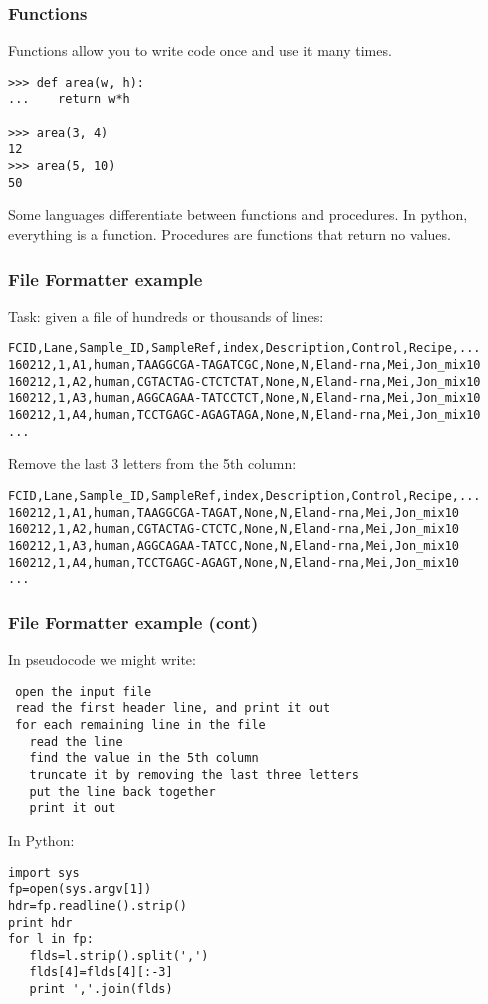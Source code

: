 \documentclass[10pt]{beamer}
\newcommand\smallfont{\fontsize{8pt}{7.2}\selectfont}
\begin{document}
\begin{frame}[fragile]
\frametitle{Functions}

Functions allow you to write code once and use it many times.

\begin{verbatim}
>>> def area(w, h):
...    return w*h

>>> area(3, 4)
12
>>> area(5, 10)
50
\end{verbatim}

Some languages differentiate between functions and procedures.  In python, everything is a function.
Procedures are functions that return no values.

\end{frame}

\begin{frame}[fragile]
\frametitle{File Formatter example}

Task: given a file of hundreds or thousands of lines:

\smallfont
\begin{verbatim}
FCID,Lane,Sample_ID,SampleRef,index,Description,Control,Recipe,...
160212,1,A1,human,TAAGGCGA-TAGATCGC,None,N,Eland-rna,Mei,Jon_mix10
160212,1,A2,human,CGTACTAG-CTCTCTAT,None,N,Eland-rna,Mei,Jon_mix10
160212,1,A3,human,AGGCAGAA-TATCCTCT,None,N,Eland-rna,Mei,Jon_mix10
160212,1,A4,human,TCCTGAGC-AGAGTAGA,None,N,Eland-rna,Mei,Jon_mix10
...
\end{verbatim}

Remove the last 3 letters from the 5th column:

\begin{verbatim}
FCID,Lane,Sample_ID,SampleRef,index,Description,Control,Recipe,...
160212,1,A1,human,TAAGGCGA-TAGAT,None,N,Eland-rna,Mei,Jon_mix10
160212,1,A2,human,CGTACTAG-CTCTC,None,N,Eland-rna,Mei,Jon_mix10
160212,1,A3,human,AGGCAGAA-TATCC,None,N,Eland-rna,Mei,Jon_mix10
160212,1,A4,human,TCCTGAGC-AGAGT,None,N,Eland-rna,Mei,Jon_mix10
...
\end{verbatim}
\end{frame}

\begin{frame}[fragile]
\frametitle{File Formatter example (cont)}
\smallfont
In pseudocode we might write:
\begin{verbatim}
 open the input file
 read the first header line, and print it out
 for each remaining line in the file
   read the line
   find the value in the 5th column
   truncate it by removing the last three letters
   put the line back together
   print it out
\end{verbatim}
In Python:
\begin{verbatim}
import sys
fp=open(sys.argv[1])
hdr=fp.readline().strip()
print hdr
for l in fp:
   flds=l.strip().split(',')
   flds[4]=flds[4][:-3]
   print ','.join(flds)
\end{verbatim}
\end{frame}
\end{document}
